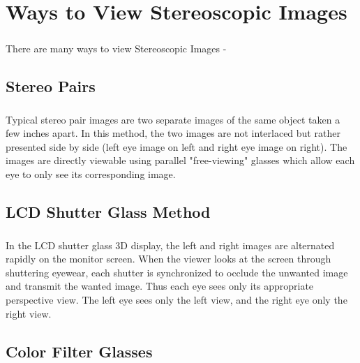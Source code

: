 \chapter{Ways to View Stereoscopic Images}

\paragraph{} There are many ways to view Stereoscopic Images -
\section{Stereo Pairs}
\paragraph{} Typical stereo pair images are two separate images of the same object taken a few inches apart. In this method, the two images are not interlaced but rather presented side by side (left eye image on left and right eye image on right). The images are directly viewable using parallel "free-viewing" glasses which allow each eye to only see its corresponding image.

\section{LCD Shutter Glass Method}
\paragraph{} In the LCD shutter glass 3D display, the left and right images are alternated rapidly on the monitor screen. When the viewer looks at the screen through shuttering eyewear, each shutter is synchronized to occlude the unwanted image and transmit the wanted image. Thus each eye sees only its appropriate perspective view. The left eye sees only the left view, and the right eye only the right view.

\section{Color Filter Glasses}
